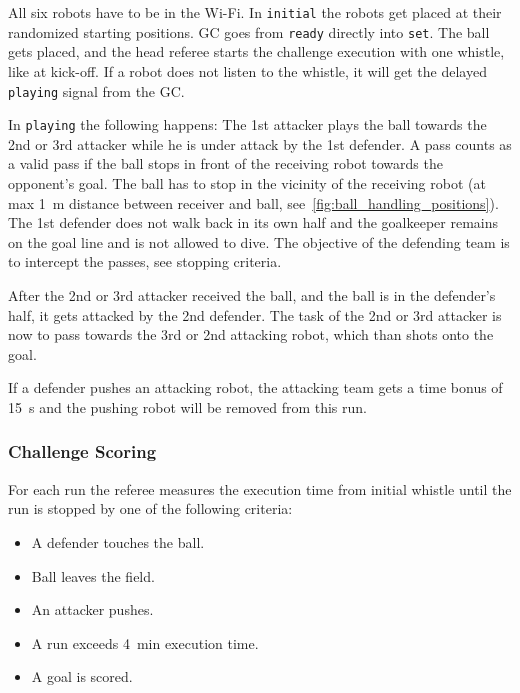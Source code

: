         All six robots have to be in the Wi-Fi. In \texttt{initial} the robots get placed at their randomized starting positions. GC goes from \texttt{ready} directly into \texttt{set}. The ball gets placed, and the head referee starts the challenge execution with one whistle, like at kick-off. If a robot does not listen to the whistle, it will get the delayed \texttt{playing} signal from the GC.

        In \texttt{playing} the following happens: The 1st attacker plays the ball towards the 2nd or 3rd attacker while he is under attack by the 1st defender.
        A pass counts as a valid pass if the ball stops in front of the receiving robot towards the opponent's goal. The ball has to stop in the vicinity of the receiving robot (at max \qty{1}{\metre} distance between receiver and ball, see~\cref{fig:ball_handling_positions}).
        The 1st defender does not walk back in its own half and the goalkeeper remains on the goal line and is not allowed to dive. The objective of the defending team is to intercept the passes, see stopping criteria.

        After the 2nd or 3rd attacker received the ball, and the ball is in the defender's half, it gets attacked by the 2nd defender. The task of the 2nd or 3rd attacker is now to pass towards the 3rd or 2nd attacking robot, which than shots onto the goal.

        If a defender pushes an attacking robot, the attacking team gets a time bonus of \qty{15}{\second} and the pushing robot will be removed from this run.

    \subsubsection{Challenge Scoring}

        For each run the referee measures the execution time from initial whistle until the run is stopped by one of the following criteria:

        \begin{itemize}
            \item A defender touches the ball.
            \item Ball leaves the field.
            \item An attacker pushes.
            \item A run exceeds \qty{4}{\minute} execution time.
            \item A goal is scored.
        \end{itemize}

